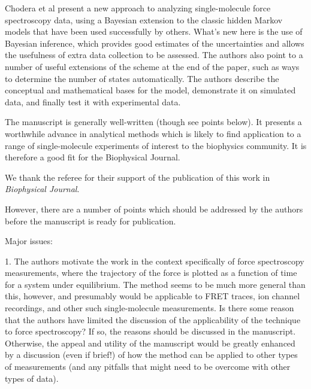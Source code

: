 \documentclass[ucb,qb3,10pt,fullfrom]{ucletter}
\begin{document}
\begin{letter}{}



Chodera et al present a new approach to analyzing single-molecule force spectroscopy data, using a Bayesian extension to the classic hidden Markov models that have been used successfully by others. What's new here is the use of Bayesian inference, which provides good estimates of the uncertainties and allows the usefulness of extra data collection to be assessed. The authors also point to a number of useful extensions of the scheme at the end of the paper, such as ways to determine the number of states automatically. The authors describe the conceptual and mathematical bases for the model, demonstrate it on simulated data, and finally test it with experimental data.

The manuscript is generally well-written (though see points below). It presents a worthwhile advance in analytical methods which is likely to find application to a range of single-molecule experiments of interest to the biophysics community. It is therefore a good fit for the Biophysical Journal. 
\color{black}

We thank the referee for their support of the publication of this work in \emph{Biophysical Journal}.

\color{red}
However, there are a number of points which should be addressed by the authors before the manuscript is ready for publication.


Major issues:

1. The authors motivate the work in the context specifically of force spectroscopy measurements, where the trajectory of the force is plotted as a function of time for a system under equilibrium. The method seems to be much more general than this, however, and presumably would be applicable to FRET traces, ion channel recordings, and other such single-molecule measurements. Is there some reason that the authors have limited the discussion of the applicability of the technique to force spectroscopy? If so, the reasons should be discussed in the manuscript. Otherwise, the appeal and utility of the manuscript would be greatly enhanced by a discussion (even if brief!) of how the method can be applied to other types of measurements (and any pitfalls that might need to be overcome with other types of data).
\color{black}


\end{letter}
\end{document}
